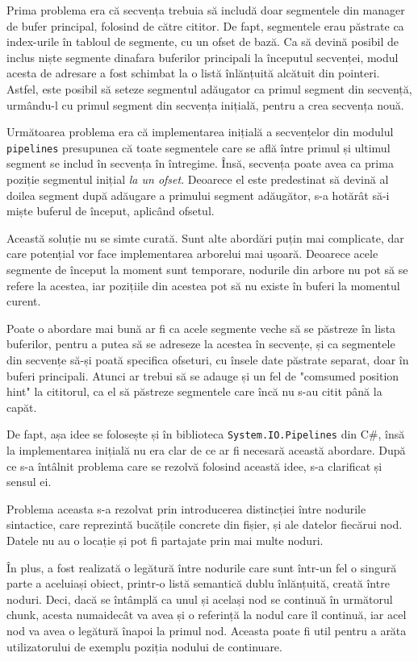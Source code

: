\documentclass[a4paper,12pt]{report}
\begin{document}
Prima problema era că secvența trebuia să includă doar segmentele din manager de bufer principal,
folosind de către cititor.
De fapt, segmentele erau păstrate ca index-urile în tabloul de segmente, cu un ofset de bază.
Ca să devină posibil de inclus niște segmente dinafara buferilor principali la începutul secvenței,
modul acesta de adresare a fost schimbat la o listă înlănțuită alcătuit din pointeri.
Astfel, este posibil să seteze segmentul adăugator ca primul segment din secvență, urmându-l cu
primul segment din secvența inițială, pentru a crea secvența nouă.

Următoarea problema era că implementarea inițială a secvențelor din modulul \texttt{pipelines} presupunea
că toate segmentele care se află între primul și ultimul segment se includ în secvența în întregime.
Însă, secvența poate avea ca prima poziție segmentul inițial \textit{la un ofset}.
Deoarece el este predestinat să devină al doilea segment după adăugare a primului segment adăugător,
s-a hotărât să-i miște buferul de început, aplicând ofsetul.

Această soluție nu se simte curată.
Sunt alte abordări puțin mai complicate, dar care potențial vor face implementarea arborelui mai ușoară.
Deoarece acele segmente de început la moment sunt temporare,
nodurile din arbore nu pot să se refere la acestea, iar pozițiile din acestea pot să nu existe în buferi la momentul curent.

Poate o abordare mai bună ar fi ca acele segmente veche să se păstreze în lista buferilor,
pentru a putea să se adreseze la acestea în secvențe,
și ca segmentele din secvențe să-și poată specifica ofseturi,
cu însele date păstrate separat, doar în buferi principali.
Atunci ar trebui să se adauge și un fel de "comsumed position hint" la cititorul,
ca el să păstreze segmentele care încă nu s-au citit până la capăt.

De fapt, așa idee se folosește și în biblioteca \texttt{System.IO.Pipelines} din C\#,
însă la implementarea inițială nu era clar de ce ar fi necesară această abordare.
După ce s-a întâlnit problema care se rezolvă folosind această idee, s-a clarificat și sensul ei.

Problema aceasta s-a rezolvat prin introducerea distincției între nodurile sintactice,
care reprezintă bucățile concrete din fișier, și ale datelor fiecărui nod.
Datele nu au o locație și pot fi partajate prin mai multe noduri.

În plus, a fost realizată o legătură între nodurile care sunt într-un fel o singură parte a aceluiași obiect,
printr-o listă semantică dublu înlănțuită, creată între noduri.
Deci, dacă se întâmplă ca unul și același nod se continuă în următorul chunk,
acesta numaidecât va avea și o referință la nodul care îl continuă,
iar acel nod va avea o legătură înapoi la primul nod.
Aceasta poate fi util pentru a arăta utilizatorului de exemplu poziția nodului de continuare.
\end{document}

